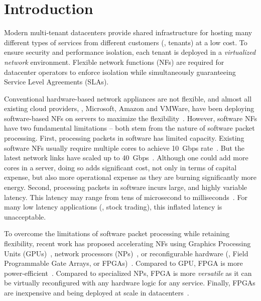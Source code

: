 \section{Introduction}

Modern multi-tenant datacenters provide shared infrastructure for hosting many different types of services 
from different customers (\ie, tenants) at a low cost.
%
To ensure security and performance isolation, each tenant is deployed in a \textit{virtualized network} environment. 
Flexible network functions (NFs) are required for datacenter operators to enforce isolation 
while simultaneously guaranteeing Service Level Agreements (SLAs). 

Conventional hardware-based network appliances are not flexible, 
and almost all existing cloud providers, \eg, Microsoft, Amazon and VMWare,
have been deploying software-based NFs on servers to
maximize the flexibility~\cite{albert-ons, vmware-multi-tenancy}.
%
However, software NFs have two fundamental limitations -- both stem 
from the nature of software packet processing.   
First, processing packets in software has limited capacity. 
% 
Existing software NFs usually require multiple cores to achieve 10~Gbps rate~\cite{comb, martins2014clickos}. 
But the latest network links have scaled up to 40~Gbps~\cite{mellanox-100g}. 
Although one could add more cores in a server, doing so adds significant cost,  
not only in terms of capital expense, but also more operational expense as they are burning significantly more energy. 
%
Second, processing packets in software incurs large, and highly variable latency. This latency may range 
from tens of microsecond to milliseconds~\cite{martins2014clickos, ananta, duet}. 
For many low latency applications (\eg, stock trading), this inflated latency is unacceptable. 

To overcome the limitations of software packet processing while retaining flexibility,
recent work has proposed accelerating NFs using  
Graphics Processing Units (GPUs)~\cite{packetshader}, network processors (NPs)~\cite{cavium, netronome},
or reconfigurable hardware (\ie, Field Programmable Gate Arrays, or FPGAs)~\cite{netfpga, smartnic, rubow2010chimpp}.
Compared to GPU, FPGA is more power-efficient~\cite{fpga-vs-gpu,fpga-vs-gpu2}. 
Compared to specialized NPs, FPGA is more \textit{versatile} 
as it can be virtually reconfigured with any hardware logic for any service.
Finally, FPGAs are inexpensive and being deployed at scale in datacenters~\cite{smartnic, putnam2014reconfigurable}.

